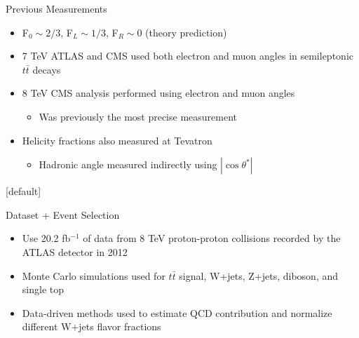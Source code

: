 \documentclass{beamer}
\begin{document}
{\begin{frame}{Previous Measurements}
{    }
    \vspace{-10pt}
    \begin{itemize}
      \small
    \item F$_0\sim2/3$, F$_L\sim1/3$, F$_R\sim0$ (theory prediction)
    \item 7 TeV ATLAS and CMS used both electron and muon angles in semileptonic $t\bar{t}$ decays
    \item 8 TeV CMS analysis performed using electron and muon angles
      \begin{itemize}
      \item Was previously the most precise measurement
      \end{itemize}
    \item Helicity fractions also measured at Tevatron
      \begin{itemize}
        \footnotesize
      \item Hadronic angle measured indirectly using $|\cos\theta^*|$
      \end{itemize}
    \end{itemize}
  \end{frame}

  \makeatletter %
  [default]
  \def\beamer@entrycode{\vspace*{-1.075\headheight}}
  \begin{frame}{Dataset + Event Selection}
    \begin{itemize}
      \footnotesize
    \item Use 20.2 fb$^{-1}$ of data from 8 TeV proton-proton collisions recorded by the ATLAS detector in 2012
    \item Monte Carlo simulations used for $t\bar{t}$ signal, W+jets, Z+jets, diboson, and single top
    \item Data-driven methods used to estimate QCD contribution and normalize different W+jets flavor fractions
    \end{itemize}
    \begin{columns}


\end{columns}
\end{frame}}
\end{document}
